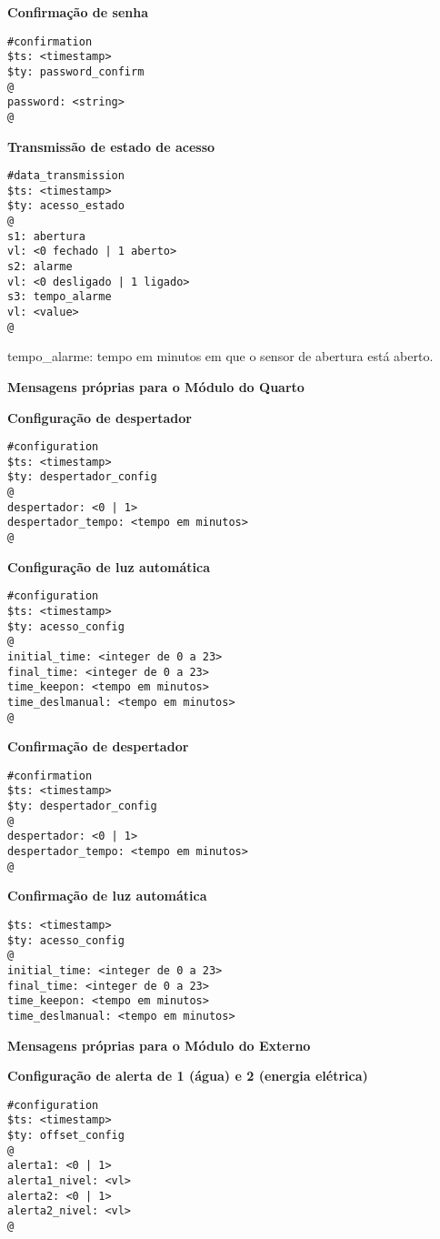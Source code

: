 \textbf{Confirmação de senha}
\begin{lstlisting}
#confirmation
$ts: <timestamp>
$ty: password_confirm
@
password: <string>
@
\end{lstlisting}

\textbf{Transmissão de estado de acesso}
\begin{lstlisting}
#data_transmission
$ts: <timestamp>
$ty: acesso_estado
@
s1: abertura
vl: <0 fechado | 1 aberto>
s2: alarme
vl: <0 desligado | 1 ligado>
s3: tempo_alarme
vl: <value>
@
\end{lstlisting}

tempo\_alarme: tempo em minutos em que o sensor de abertura está aberto.

\textbf{Mensagens próprias para o Módulo do Quarto}

\textbf{Configuração de despertador}
\begin{lstlisting}
#configuration
$ts: <timestamp>
$ty: despertador_config
@
despertador: <0 | 1>
despertador_tempo: <tempo em minutos>
@
\end{lstlisting}

\textbf{Configuração de luz automática}
\begin{lstlisting}
#configuration
$ts: <timestamp>
$ty: acesso_config
@
initial_time: <integer de 0 a 23>
final_time: <integer de 0 a 23>
time_keepon: <tempo em minutos>
time_deslmanual: <tempo em minutos>
@
\end{lstlisting}

\textbf{Confirmação de despertador}
\begin{lstlisting}
#confirmation
$ts: <timestamp>
$ty: despertador_config
@
despertador: <0 | 1>
despertador_tempo: <tempo em minutos>
@
\end{lstlisting}

\textbf{Confirmação de luz automática}
\begin{lstlisting}
$ts: <timestamp>
$ty: acesso_config
@
initial_time: <integer de 0 a 23>
final_time: <integer de 0 a 23>
time_keepon: <tempo em minutos>
time_deslmanual: <tempo em minutos>
\end{lstlisting}

\textbf{Mensagens próprias para o Módulo do Externo}

\textbf{Configuração de alerta de 1 (água) e 2 (energia elétrica)}
\begin{lstlisting}
#configuration
$ts: <timestamp>
$ty: offset_config
@
alerta1: <0 | 1>
alerta1_nivel: <vl>
alerta2: <0 | 1>
alerta2_nivel: <vl>
@
\end{lstlisting}

